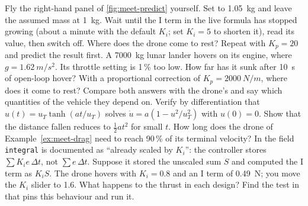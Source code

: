 \begin{exercises}
\exercise[2] Fly the right-hand panel of \cref{fig:meet-predict} yourself. Set  to \SI{1.05}{kg} and leave the assumed mass at \SI{1}{kg}. Wait until the I term in the live formula has stopped growing (about a minute with the default $K_i$; set $K_i = 5$ to shorten it), read its value, then switch \It off. Where does the drone come to rest? Repeat with $K_p = 20$ and predict the result first.
\exercise[2] A \SI{7000}{kg} lunar lander hovers on its engine, where $g = \SI{1.62}{m/s^2}$. Its throttle setting is 1\,\% too low. How far has it sunk after \SI{10}{s} of open-loop hover? With a proportional correction of $K_p = \SI{2000}{N/m}$, where does it come to rest? Compare both answers with the drone's and say which quantities of the vehicle they depend on.
\exercise[3] Verify by differentiation that $u(t) = u_T\tanh(a t/u_T)$ solves $\dot u = a(1 - u^2/u_T^2)$ with $u(0) = 0$. Show that the distance fallen reduces to $\tfrac12 a t^2$ for small $t$. How long does the drone of Example~\ref{ex:meet-drag} need to reach 90\,\% of its terminal velocity?
\exercise[2] In  the field \texttt{integral} is documented as \enquote{already scaled by $K_i$}: the controller stores $\sum K_i e\,\Delta t$, not $\sum e\,\Delta t$. Suppose it stored the unscaled sum $S$ and computed the I term as $K_i S$. The drone hovers with $K_i = 0.8$ and an I term of \SI{0.49}{N}; you move the $K_i$ slider to 1.6. What happens to the thrust in each design? Find the test in  that pins this behaviour and run it.

\end{exercises}
